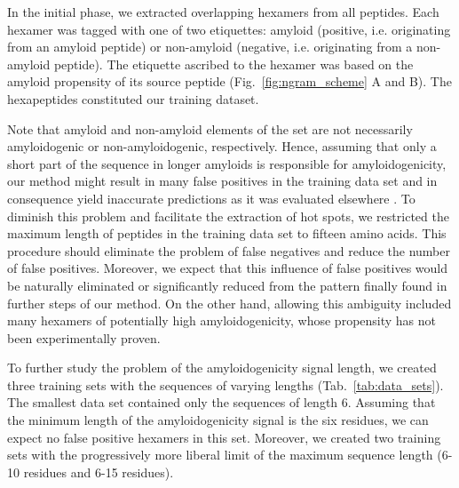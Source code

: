 \documentclass[fleqn,10pt,twoside]{gcb15submission}
\begin{document}
In the initial phase, we extracted overlapping hexamers from all peptides. 
Each hexamer was tagged with one of two etiquettes: amyloid (positive, i.e. originating from an amyloid peptide) or non-amyloid (negative, i.e. originating from a non-amyloid peptide). The etiquette ascribed to the hexamer was based on the amyloid propensity of its source peptide (Fig.~\ref{fig:ngram_scheme} A and B). The hexapeptides constituted our training dataset. 

  Note that amyloid and non-amyloid elements of the set are not necessarily amyloidogenic or non-amyloidogenic, respectively. Hence, assuming that only a short part of the sequence in longer amyloids is 
responsible for amyloidogenicity, our method might result in many false 
positives in the training data set and in consequence yield inaccurate 
predictions as it was evaluated elsewhere \citep{kotulska_amyloid_2013}. To 
diminish this problem and facilitate the extraction of hot spots, we restricted 
the maximum length of peptides in the training data set to fifteen amino acids. This procedure should eliminate the problem of false negatives and reduce the number of false positives. Moreover, we expect that this  influence of false positives  would be naturally eliminated or significantly reduced from the pattern finally found in further steps of our method. On the other hand, allowing this ambiguity included many hexamers of potentially high amyloidogenicity, whose propensity has not been experimentally proven. 
%
%
%
%
%

  To further study the problem of the amyloidogenicity signal length, we created 
three training sets with the sequences of varying lengths 
%
%
%
%
%
(Tab.~\ref{tab:data_sets}). The smallest data set contained only the sequences 
of length 6. Assuming that the minimum length of the amyloidogenicity signal is 
the six residues, we can expect no false positive hexamers in this set. Moreover, we created 
two training sets with the progressively more liberal limit of the maximum 
sequence length (6-10 residues and 6-15 residues).
\end{document}
